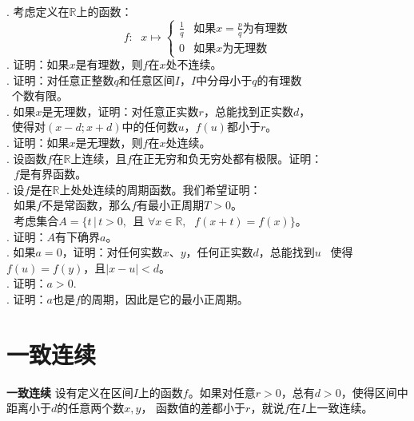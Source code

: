 \documentclass[12pt,UTF8]{ctexbook}
\begin{document}
\begin{appendix}
\begin{xt}
    \mbox{} \\
    . 考虑定义在$\mathbb{R}$上的函数：
    $$ f: \;\,\, x\mapsto \left\{
    \begin{array}{cl}
        \frac{1}{q} & \mbox{如果}x = \frac{p}{q}\mbox{为有理数} \\
        0           & \mbox{如果}x\mbox{为无理数} 
    \end{array}\right.
    $$
    . 证明：如果$x$是有理数，则$f$在$x$处不连续。\\
    . 证明：对任意正整数$q$和任意区间$I$，$I$中分母小于$q$的有理数\\
    \indent\quad\;\;\, 个数有限。\\
    . 如果$x$是无理数，证明：对任意正实数$r$，总能找到正实数$d$，\\
    \indent\quad\;\;\, 使得对$(x - d; x + d)$中的任何数$u$，$f(u)$都小于$r$。\\
    . 证明：如果$x$是无理数，则$f$在$x$处连续。\\
    . 设函数$f$在$\mathbb{R}$上连续，且$f$在正无穷和负无穷处都有极限。证明：\\
    \indent\;\;\,\, $f$是有界函数。\\
    . 设$f$是在$\mathbb{R}$上处处连续的周期函数。我们希望证明：\\
    \indent\;\;\,\, 如果$f$不是常函数，那么$f$有最小正周期$T>0$。\\
    \indent\;\;\,\, 考虑集合$A = \{t \, | \, t > 0,\;\, \mbox{且}\,\,\forall x\in\mathbb{R},\;\,\, f(x+t) = f(x)\}$。\\
    . 证明：$A$有下确界$a$。\\
    . 如果$a = 0$，证明：对任何实数$x$、$y$，任何正实数$d$，总能找到$u$
    \indent\quad\;\;\, 使得$f(u) = f(y)$，且$|x - u| < d$。\\
    . 证明：$a > 0.$\\
    . 证明：$a$也是$f$的周期，因此是它的最小正周期。
\end{xt}

\section{一致连续}

\begin{df}{\textbf{一致连续}}\label{df:b-2-10}
    设有定义在区间$I$上的函数$f$。如果对任意$r>0$，总有$d>0$，使得区间中距离小于$d$的任意两个数$x,y$，
    函数值的差都小于$r$，就说$f$在$I$上一致连续。
\end{df}


\end{appendix}
\end{document}
